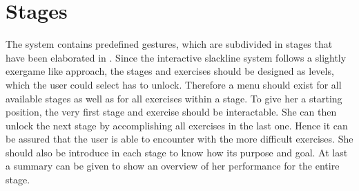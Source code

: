 \section{Stages}\label{4_3_stages}
The system contains predefined gestures, which are subdivided in stages that have been elaborated in \textbf{}. Since the interactive slackline system follows a slightly exergame like approach, the stages and exercises should be designed as levels, which the user could select has to unlock. Therefore a menu should exist for all available stages as well as for all exercises within a stage. To give her a starting position, the very first stage and exercise should be interactable. 
She can then unlock the next stage by accomplishing all exercises in the last one. Hence it can be assured that the user is able to encounter with the more difficult exercises. She should also be introduce in each stage to know how its purpose and goal. At last a summary can be given to show an overview of her performance for the entire stage.

